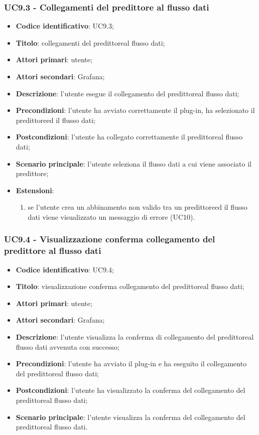 \subsubsection{UC9.3 - Collegamenti del predittore al flusso dati}
\begin{itemize}
	\item \textbf{Codice identificativo}: UC9.3;
	\item \textbf{Titolo}: collegamenti del predittore\glosp al flusso dati;
	\item \textbf{Attori primari}: utente;
	\item \textbf{Attori secondari}: Grafana\glo;
	\item \textbf{Descrizione}: l'utente esegue il collegamento del predittore\glosp al flusso dati;
	\item \textbf{Precondizioni}: l'utente ha avviato correttamente il plug-in, ha selezionato il predittore\glosp ed il flusso dati;
	\item \textbf{Postcondizioni}: l'utente ha collegato correttamente il predittore\glosp al flusso dati;
	\item \textbf{Scenario principale}: l'utente seleziona il flusso dati a cui viene associato il predittore\glo;
	\item \textbf{Estensioni}:
	\begin{enumerate}
		\item se l'utente crea un abbinamento non valido tra un predittore\glosp ed il flusso dati viene visualizzato un messaggio di errore (UC10).
	\end{enumerate}
\end{itemize}

\subsubsection{UC9.4 - Visualizzazione conferma collegamento del predittore al flusso dati}
\begin{itemize}
	\item \textbf{Codice identificativo}: UC9.4;
	\item \textbf{Titolo}: visualizzazione conferma collegamento del predittore\glosp al flusso dati;
	\item \textbf{Attori primari}: utente;
	\item \textbf{Attori secondari}: Grafana\glo;
	\item \textbf{Descrizione}: l'utente visualizza la conferma di collegamento del predittore\glosp al flusso dati avvenuta con successo;
	\item \textbf{Precondizioni}: l'utente ha avviato il plug-in e ha eseguito il collegamento del predittore\glosp al flusso dati;
	\item \textbf{Postcondizioni}: l'utente ha visualizzato la conferma del collegamento del predittore\glosp al flusso dati;
	\item \textbf{Scenario principale}: l'utente visualizza la conferma del collegamento del predittore\glosp al flusso dati.
\end{itemize}